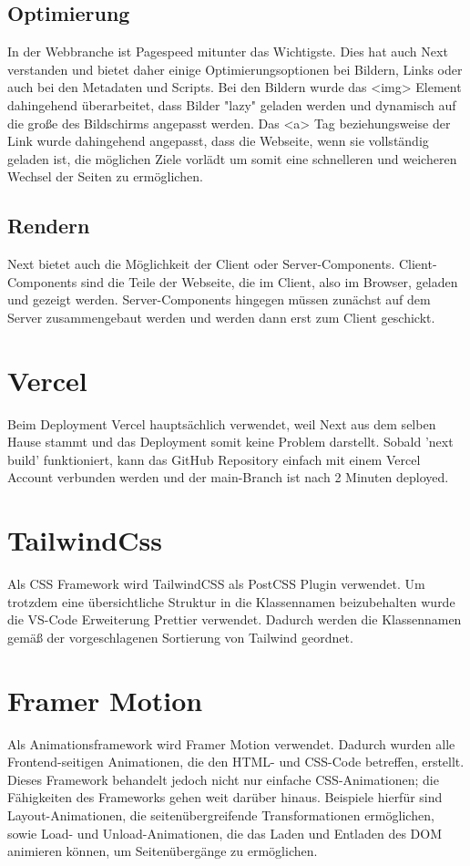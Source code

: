 \subsection{Optimierung}
In der Webbranche ist Pagespeed mitunter das Wichtigste. Dies hat auch Next verstanden und bietet daher einige Optimierungsoptionen bei Bildern, Links oder auch bei den Metadaten und Scripts. 
Bei den Bildern wurde das <img> Element dahingehend überarbeitet, dass Bilder "lazy" geladen werden und dynamisch auf die große des Bildschirms angepasst werden. 
Das <a> Tag beziehungsweise der Link wurde dahingehend angepasst, dass die Webseite, wenn sie vollständig geladen ist, die möglichen Ziele vorlädt um somit eine schnelleren und weicheren Wechsel der Seiten zu ermöglichen. \cite{nextjsdocsoptimizations}

\subsection{Rendern}
Next bietet auch die Möglichkeit der Client oder Server-Components. Client-Components sind die Teile der Webseite, die im Client, also im Browser, geladen und gezeigt werden.
Server-Components hingegen müssen zunächst auf dem Server zusammengebaut werden und werden dann erst zum Client geschickt. \cite{nextjsdocsrendering}

\section{Vercel}
Beim Deployment Vercel hauptsächlich verwendet, weil Next aus dem selben Hause stammt und das Deployment somit keine Problem darstellt.
Sobald 'next build' funktioniert, kann das GitHub Repository einfach mit einem Vercel Account verbunden werden und der main-Branch ist nach 2 Minuten deployed. \cite{vercel}

\section{TailwindCss}
Als CSS Framework wird TailwindCSS als PostCSS Plugin verwendet. 
Um trotzdem eine übersichtliche Struktur in die Klassennamen beizubehalten wurde die VS-Code Erweiterung Prettier verwendet. 
Dadurch werden die Klassennamen gemäß der vorgeschlagenen Sortierung von Tailwind geordnet.


\section{Framer Motion}
Als Animationsframework wird Framer Motion verwendet.
Dadurch wurden alle Frontend-seitigen Animationen, die den HTML- und CSS-Code betreffen, erstellt. Dieses Framework behandelt jedoch nicht nur einfache CSS-Animationen; die Fähigkeiten des Frameworks gehen weit darüber hinaus. Beispiele hierfür sind Layout-Animationen, die seitenübergreifende Transformationen ermöglichen, sowie Load- und Unload-Animationen, die das Laden und Entladen des DOM animieren können, um Seitenübergänge zu ermöglichen.

